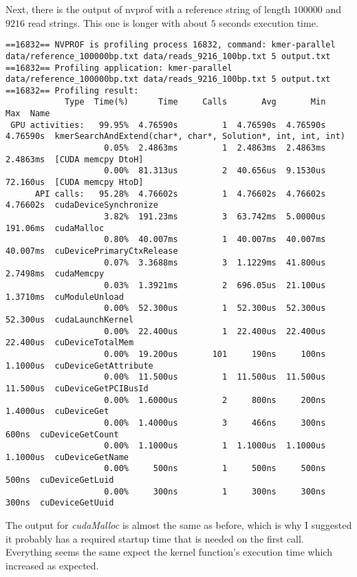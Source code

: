 \documentclass{article}
\begin{document}
Next, there is the output of nvprof with a reference string of length $100000$ and $9216$ read strings. This one is longer with about $5$ seconds execution time.


\begin{lstlisting}
==16832== NVPROF is profiling process 16832, command: kmer-parallel data/reference_100000bp.txt data/reads_9216_100bp.txt 5 output.txt
==16832== Profiling application: kmer-parallel data/reference_100000bp.txt data/reads_9216_100bp.txt 5 output.txt
==16832== Profiling result:
            Type  Time(%)      Time     Calls       Avg       Min       Max  Name
 GPU activities:   99.95%  4.76590s         1  4.76590s  4.76590s  4.76590s  kmerSearchAndExtend(char*, char*, Solution*, int, int, int)
                    0.05%  2.4863ms         1  2.4863ms  2.4863ms  2.4863ms  [CUDA memcpy DtoH]
                    0.00%  81.313us         2  40.656us  9.1530us  72.160us  [CUDA memcpy HtoD]
      API calls:   95.28%  4.76602s         1  4.76602s  4.76602s  4.76602s  cudaDeviceSynchronize
                    3.82%  191.23ms         3  63.742ms  5.0000us  191.06ms  cudaMalloc
                    0.80%  40.007ms         1  40.007ms  40.007ms  40.007ms  cuDevicePrimaryCtxRelease
                    0.07%  3.3688ms         3  1.1229ms  41.800us  2.7498ms  cudaMemcpy
                    0.03%  1.3921ms         2  696.05us  21.100us  1.3710ms  cuModuleUnload
                    0.00%  52.300us         1  52.300us  52.300us  52.300us  cudaLaunchKernel
                    0.00%  22.400us         1  22.400us  22.400us  22.400us  cuDeviceTotalMem
                    0.00%  19.200us       101     190ns     100ns  1.1000us  cuDeviceGetAttribute
                    0.00%  11.500us         1  11.500us  11.500us  11.500us  cuDeviceGetPCIBusId
                    0.00%  1.6000us         2     800ns     200ns  1.4000us  cuDeviceGet
                    0.00%  1.4000us         3     466ns     300ns     600ns  cuDeviceGetCount
                    0.00%  1.1000us         1  1.1000us  1.1000us  1.1000us  cuDeviceGetName
                    0.00%     500ns         1     500ns     500ns     500ns  cuDeviceGetLuid
                    0.00%     300ns         1     300ns     300ns     300ns  cuDeviceGetUuid
\end{lstlisting}

The output for \emph{cudaMalloc} is almost the same as before, which is why I suggested it probably has a required startup time that is needed on the first call. Everything seems the same expect the kernel function's execution time which increased as expected.
\end{document}
